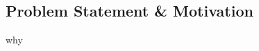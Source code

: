 \subsection{Problem Statement \& Motivation}
\label{sec:problemstatement}

why\cite{castelvecchi2016can}